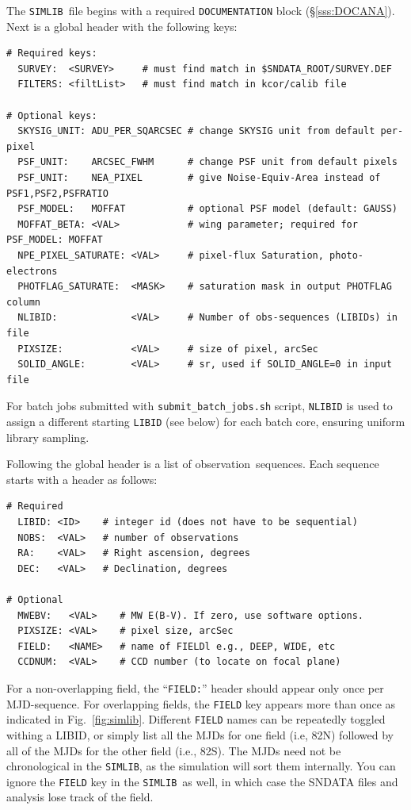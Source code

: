 \documentclass[12pt]{article}
\newcommand{\simlib}{{\tt SIMLIB}}
\newcommand{\obs}{observation}
\newcommand{\submit}{\tt submit\_batch\_jobs.sh}
\begin{document}
{The \simlib\ file begins with a required {\tt DOCUMENTATION} block
(\S\ref{sss:DOCANA}).
Next is a global header with the following keys:
\begin{verbatim}
# Required keys:
  SURVEY:  <SURVEY>     # must find match in $SNDATA_ROOT/SURVEY.DEF
  FILTERS: <filtList>   # must find match in kcor/calib file 

# Optional keys:
  SKYSIG_UNIT: ADU_PER_SQARCSEC # change SKYSIG unit from default per-pixel
  PSF_UNIT:    ARCSEC_FWHM      # change PSF unit from default pixels
  PSF_UNIT:    NEA_PIXEL        # give Noise-Equiv-Area instead of PSF1,PSF2,PSFRATIO
  PSF_MODEL:   MOFFAT           # optional PSF model (default: GAUSS)
  MOFFAT_BETA: <VAL>            # wing parameter; required for PSF_MODEL: MOFFAT
  NPE_PIXEL_SATURATE: <VAL>     # pixel-flux Saturation, photo-electrons
  PHOTFLAG_SATURATE:  <MASK>    # saturation mask in output PHOTFLAG column
  NLIBID:             <VAL>     # Number of obs-sequences (LIBIDs) in file
  PIXSIZE:            <VAL>     # size of pixel, arcSec
  SOLID_ANGLE:        <VAL>     # sr, used if SOLID_ANGLE=0 in input file
\end{verbatim} 
%
For batch jobs submitted with {\submit} script,
{\tt NLIBID} is used to assign a different starting {\tt LIBID}
(see below) for each batch core, ensuring uniform library sampling.

\clearpage
Following the global header is a list of \obs\ sequences.
Each sequence starts with a header as follows:
\begin{verbatim}
# Required
  LIBID: <ID>    # integer id (does not have to be sequential)
  NOBS:  <VAL>   # number of observations
  RA:    <VAL>   # Right ascension, degrees
  DEC:   <VAL>   # Declination, degrees

# Optional
  MWEBV:   <VAL>    # MW E(B-V). If zero, use software options.
  PIXSIZE: <VAL>    # pixel size, arcSec
  FIELD:   <NAME>   # name of FIELDl e.g., DEEP, WIDE, etc
  CCDNUM:  <VAL>    # CCD number (to locate on focal plane)
\end{verbatim}
%
For a non-overlapping field, the ``{\tt FIELD:}'' header should appear
only once per MJD-sequence. For overlapping fields, 
the {\tt FIELD} key appears more than once as indicated
in Fig.~\ref{fig:simlib}.  
Different {\tt FIELD} names can be repeatedly toggled withing a LIBID,
or simply list all the MJDs for one field (i.e, 82N) followed by all 
of the MJDs for the other field (i.e., 82S).
The MJDs need not be chronological in the \simlib, as the simulation
will sort them internally. You can ignore the {\tt FIELD} key in the
\simlib\ as well, in which case the SNDATA files and analysis lose
track of the field.


}
\end{document}
